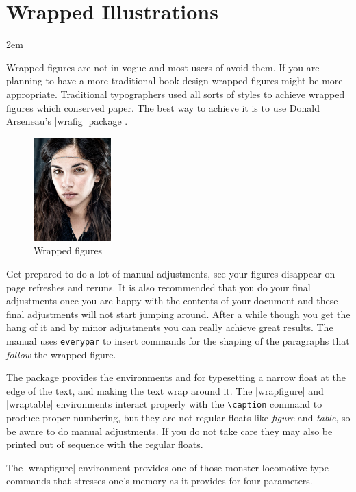 \chapter{Wrapped Illustrations}
\label{ch:wrapped}
\parindent2em
\let\onepar\lorem

Wrapped figures are not in vogue and most users of \latex avoid them.
If you are planning to have a more traditional book design wrapped figures might be more appropriate. Traditional typographers used
all sorts of styles to achieve wrapped figures which conserved paper. 
The best way to achieve it is to use Donald Arseneau's |wrafig| package \citep{wrapfig}.

\begin{figure}
    \includegraphics[width=3cm]{./images/amato.jpg}
    \caption{\footnotesize Wrapped figures}
\end{figure}

Get prepared to do a lot of manual adjustments, see your figures disappear on page refreshes and reruns. It is also recommended that you do your final adjustments once you are happy with the contents of your document and these final adjustments will not start jumping around. 
After a while though you get the hang of it and by minor adjustments you can really achieve great results. The manual uses \verb+everypar+ to insert commands for the shaping of the paragraphs that \emph{follow} the wrapped figure.

The package provides the environments  and  for typesetting a
narrow float at the edge of the text, and making the text wrap around it. The |wrapfigure|
and |wraptable| environments interact properly with the \verb+\caption+ command to produce
proper numbering, but they are not regular floats like \textit{figure} and \textit{table}, so be aware to do manual adjustments. If you do not take care 
they may also be printed out of sequence with the regular floats.

The |wrapfigure| environment  provides one of those monster locomotive type commands that stresses one's memory as it provides for four parameters.
 
